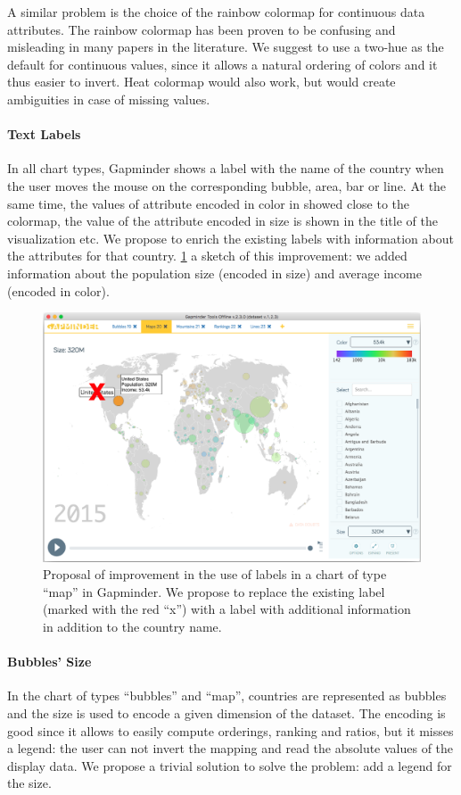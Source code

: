 A similar problem is the choice of the rainbow colormap for continuous data attributes.
The rainbow colormap has been proven to be confusing and misleading \cite{color-maps} in many papers in the literature.
We suggest to use a two-hue as the default for continuous values, since it allows a natural ordering of colors and it thus easier to invert.
Heat colormap would also work, but would create ambiguities in case of missing values.

\paragraph{Text Labels}
In all chart types, Gapminder shows a label with the name of the country when the user moves the mouse on the corresponding bubble, area, bar or line.
At the same time, the values of attribute encoded in color in showed close to the colormap, the value of the attribute encoded in size is shown in the title of the visualization etc.
We propose to enrich the existing labels with information about the attributes for that country.
\cref{fig:labels-custom} a sketch of this improvement:
we added information about the population size (encoded in size) and average income (encoded in color).

\begin{figure}[h]
	\centering
	\includegraphics[width=0.95\columnwidth]{figures/labels-custom}
	\caption{Proposal of improvement in the use of labels in a chart of type ``map'' in Gapminder. We propose to replace the existing label (marked with the red ``x'') with a label with additional information in addition to the country name.}
	\label{fig:labels-custom}
\end{figure}


\paragraph{Bubbles' Size}
In the chart of types ``bubbles'' and ``map'', countries are represented as bubbles and the size is used to encode a given dimension of the dataset.
The encoding is good since it allows to easily compute orderings, ranking and ratios, but it misses a legend:
the user can not invert the mapping and read the absolute values of the display data.
We propose a trivial solution to solve the problem: add a legend for the size.

